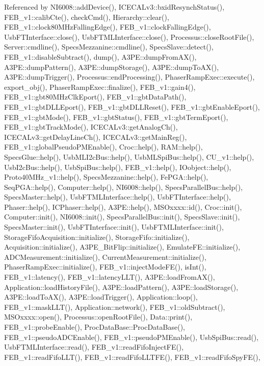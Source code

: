 Referenced by N\+I6008\+::add\+Device(), I\+C\+E\+C\+A\+Lv3\+::bxid\+Resynch\+Status(), F\+E\+B\+\_\+v1\+::calib\+Cte(), check\+Cmd(), Hierarchy\+::clear(), F\+E\+B\+\_\+v1\+::clock80\+M\+Hz\+Falling\+Edge(), F\+E\+B\+\_\+v1\+::clock\+Falling\+Edge(), Usb\+F\+T\+Interface\+::close(), Usb\+F\+T\+M\+L\+Interface\+::close(), Processus\+::close\+Root\+File(), Server\+::cmdline(), Specs\+Mezzanine\+::cmdline(), Specs\+Slave\+::detect(), F\+E\+B\+\_\+v1\+::disable\+Subtract(), dump(), A3\+P\+E\+::dump\+From\+A\+X(), A3\+P\+E\+::dump\+Pattern(), A3\+P\+E\+::dump\+Storage(), A3\+P\+E\+::dump\+To\+A\+X(), A3\+P\+E\+::dump\+Trigger(), Processus\+::end\+Processing(), Phaser\+Ramp\+Exec\+::execute(), export\+\_\+obj(), Phaser\+Ramp\+Exec\+::finalize(), F\+E\+B\+\_\+v1\+::gain4(), F\+E\+B\+\_\+v1\+::gbt80\+M\+Hz\+Clk\+Eport(), F\+E\+B\+\_\+v1\+::gbt\+Data\+Path(), F\+E\+B\+\_\+v1\+::gbt\+D\+L\+L\+Eport(), F\+E\+B\+\_\+v1\+::gbt\+D\+L\+L\+Reset(), F\+E\+B\+\_\+v1\+::gbt\+Enable\+Eport(), F\+E\+B\+\_\+v1\+::gbt\+Mode(), F\+E\+B\+\_\+v1\+::gbt\+Status(), F\+E\+B\+\_\+v1\+::gbt\+Term\+Eport(), F\+E\+B\+\_\+v1\+::gbt\+Track\+Mode(), I\+C\+E\+C\+A\+Lv3\+::get\+Analog\+Ch(), I\+C\+E\+C\+A\+Lv3\+::get\+Delay\+Line\+Ch(), I\+C\+E\+C\+A\+Lv3\+::get\+Main\+Reg(), F\+E\+B\+\_\+v1\+::global\+Pseudo\+P\+M\+Enable(), Croc\+::help(), R\+A\+M\+::help(), Specs\+Glue\+::help(), Usb\+M\+L\+I2c\+Bus\+::help(), Usb\+M\+L\+Spi\+Bus\+::help(), C\+U\+\_\+v1\+::help(), Usb\+I2c\+Bus\+::help(), Usb\+Spi\+Bus\+::help(), F\+E\+B\+\_\+v1\+::help(), I\+Oobject\+::help(), Proto40\+M\+Hz\+\_\+v1\+::help(), Specs\+Mezzanine\+::help(), Fe\+P\+G\+A\+::help(), Seq\+P\+G\+A\+::help(), Computer\+::help(), N\+I6008\+::help(), Specs\+Parallel\+Bus\+::help(), Specs\+Master\+::help(), Usb\+F\+T\+M\+L\+Interface\+::help(), Usb\+F\+T\+Interface\+::help(), Phaser\+::help(), I\+C\+Phaser\+::help(), A3\+P\+E\+::help(), M\+S\+Oxxxx\+::id(), Croc\+::init(), Computer\+::init(), N\+I6008\+::init(), Specs\+Parallel\+Bus\+::init(), Specs\+Slave\+::init(), Specs\+Master\+::init(), Usb\+F\+T\+Interface\+::init(), Usb\+F\+T\+M\+L\+Interface\+::init(), Storage\+Fifo\+Acquisition\+::initialize(), Storage\+Fifo\+::initialize(), Acquisition\+::initialize(), A3\+P\+E\+\_\+\+Bit\+Flip\+::initialize(), Emulate\+F\+E\+::initialize(), A\+D\+C\+Measurement\+::initialize(), Current\+Measurement\+::initialize(), Phaser\+Ramp\+Exec\+::initialize(), F\+E\+B\+\_\+v1\+::inject\+Mode\+F\+E(), is\+Int(), F\+E\+B\+\_\+v1\+::latency(), F\+E\+B\+\_\+v1\+::latency\+L\+L\+T(), A3\+P\+E\+::load\+From\+A\+X(), Application\+::load\+History\+File(), A3\+P\+E\+::load\+Pattern(), A3\+P\+E\+::load\+Storage(), A3\+P\+E\+::load\+To\+A\+X(), A3\+P\+E\+::load\+Trigger(), Application\+::loop(), F\+E\+B\+\_\+v1\+::mask\+L\+L\+T(), Application\+::network(), F\+E\+B\+\_\+v1\+::old\+Subtract(), M\+S\+Oxxxx\+::open(), Processus\+::open\+Root\+File(), Data\+::print(), F\+E\+B\+\_\+v1\+::probe\+Enable(), Proc\+Data\+Base\+::\+Proc\+Data\+Base(), F\+E\+B\+\_\+v1\+::pseudo\+A\+D\+C\+Enable(), F\+E\+B\+\_\+v1\+::pseudo\+P\+M\+Enable(), Usb\+Spi\+Bus\+::read(), Usb\+F\+T\+M\+L\+Interface\+::read(), F\+E\+B\+\_\+v1\+::read\+Fifo\+Inject\+F\+E(), F\+E\+B\+\_\+v1\+::read\+Fifo\+L\+L\+T(), F\+E\+B\+\_\+v1\+::read\+Fifo\+L\+L\+T\+F\+E(), F\+E\+B\+\_\+v1\+::read\+Fifo\+Spy\+F\+E(), 